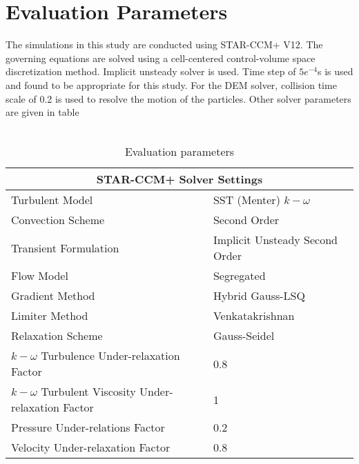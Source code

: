 \section{Evaluation Parameters}
The simulations in this study are conducted using STAR-CCM+ V12. The governing equations  are solved using a cell-centered control-volume space discretization method. Implicit unsteady solver is used. Time step of $5e^{-4}$s is used and found to be appropriate for this study. For the DEM solver, collision time scale of 0.2 is used to resolve the motion  of the particles. Other solver parameters are given in table\\ \\ 
\begin{table}
\caption{Evaluation parameters}
\begin{tabular}{ |p{9cm}|p{7cm}|}
 \hline
 \multicolumn{2}{|c|}{STAR-CCM+ Solver Settings} \\
 \hline
 Turbulent Model& SST (Menter) $k-\omega$\\
 Convection Scheme & Second Order\\
 Transient Formulation & Implicit Unsteady Second Order\\
 Flow Model   & Segregated\\
 Gradient Method & Hybrid Gauss-LSQ\\
 Limiter Method & Venkatakrishnan \\
 Relaxation Scheme & Gauss-Seidel\\
 $k-\omega$ Turbulence Under-relaxation Factor & 0.8\\
 $k-\omega$ Turbulent Viscosity Under-relaxation Factor & 1\\
 Pressure Under-relations Factor & 0.2\\
 Velocity Under-relaxation Factor & 0.8\\
 \hline
\end{tabular}
\end{table}



























